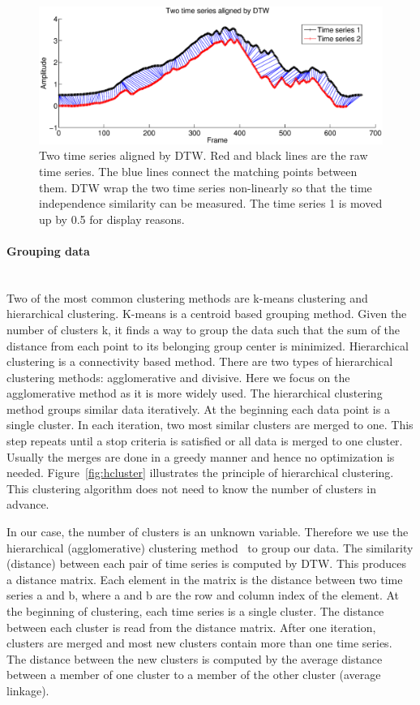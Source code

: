 \begin{figure}
  \centering
  \includegraphics[width=16cm]{./fig_cha4/alignDTW.eps}
  \caption{ \scriptsize{Two time series aligned by DTW. Red and black lines are the raw time series. The blue lines connect the matching points between them. DTW wrap the two time series non-linearly so that the time independence similarity can be measured. The time series 1 is moved up by 0.5 for display reasons.}
}
\label{fig:alignDTW}
\end{figure}



\paragraph{Grouping data} ~\\
Two of the most common clustering methods are k-means clustering and hierarchical clustering. K-means is a centroid based grouping method. Given the number of clusters k, it finds a way to group the data such that the sum of the distance from each point to its belonging group center is minimized. Hierarchical clustering is a connectivity based method. There are two types of hierarchical clustering methods: agglomerative and divisive. Here we focus on the agglomerative method as it is more widely used. The hierarchical clustering method groups similar data iteratively. At the beginning each data point is a single cluster. In each iteration, two most similar clusters are merged to one. This step repeats until a stop criteria is satisfied or all data is merged to one cluster. Usually the merges are done in a greedy manner and hence no optimization is needed. Figure~\ref{fig:hcluster} illustrates the principle of hierarchical clustering. This clustering algorithm does not need to know the number of clusters in advance.

In our case, the number of clusters is an unknown variable. Therefore we use the hierarchical (agglomerative) clustering method~\cite{willett1988recent} to group our data. The similarity (distance) between each pair of time series is computed by DTW. This produces a distance matrix. Each element in the matrix is the distance between two time series a and b, where a and b are the row and column index of the element. At the beginning of clustering, each time series is a single cluster. The distance between each cluster is read from the distance matrix. After one iteration, clusters are merged and most new clusters contain more than one time series. The distance between the new clusters is computed by the average distance between a member of one cluster to a member of the other cluster (average linkage).

